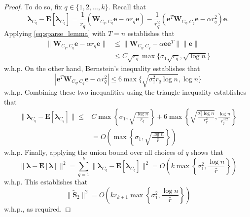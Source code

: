 \documentclass[twoside,11pt]{article}
\newcommand{\E}{\mathbf{E}}
\newcommand{\St}{\bs{\tilde S}}
\newcommand{\e}{\bs {e}}
\newcommand{\bs}{\boldsymbol}
\newcommand{\W}{\bs {W}}
\newcommand{\0}{\bs{0}}
\newcommand{\rbra}[1]{\ensuremath{\left( #1 \right)}} %
\newcommand{\bra}[1]{\ensuremath{\left\{ #1 \right\}}} %
\begin{document}
{\begin{proof}
\newcommand{\bl}{\bs{\lambda}}
To do so, fix $q \in \{1,2,\dots, k\}$. Recall that
\[
	\bl_{C_q} - \E[\bl_{C_q}] = \frac{1}{r_q} ( \W_{C_q, C_q} \e - \alpha r_q \e )
		- \frac{1}{r_q^2} (\e^T \W_{C_q, C_q} \e - \alpha r_q^2) \e.
\]
Applying \eqref{eq:sparse_lemma} with $T = n$ establishes that
\begin{align*}
	\| \W_{C_q, C_q} \e - \alpha r_q \e \| &\le  \|\W_{C_q, C_q}  - \alpha \e\e^T \| \|\e\| \\
	& \le C \sqrt{r_q} \max\{ \sigma_1 \sqrt{ r_q}, \sqrt{\log n} \} 
\end{align*}
w.h.p.
On the other hand, Bernstein's inequality establishes that
\[
	|  \e^T \W_{C_q, C_q} \e - \alpha r_q^2 | \le 6 \max \{ \sqrt{\sigma_1^2 r_q \log n}, \log n \}
\]
w.h.p.
Combining these two inequalities using the triangle inequality establishes that
\begin{align*}
	\| \bl_{C_q} - \E[\bl_{C_q}] \| \le &C \max \bra{ \sigma_1, \sqrt{\frac{\log n}{r_q } } }
		+ 6 \max \bra { \sqrt{ \frac{\sigma_1^2 \log n}{r_q^2}}, \frac{\log n}{r_q^{3/2} } } \\
		&= O \rbra{ \max \bra{ \sigma_1, \sqrt{ \frac{ \log n}{\hat r} } } }
\end{align*}
w.h.p.
Finally, applying the union bound over all choices of $q$ shows that
\[
	\| \bl - \E [ \bl ] \|^2 = \sum_{q=1}^k \| \bl_{C_q} - \E[\bl_{C_q}] \|^2
		= O \rbra{  k \max \bra{ \sigma_1^2, \frac{\log n}{\hat r} } }
\]
w.h.p.
This establishes that
\[
	\|\St_2\|^2 = O\rbra{k r_{k+1} \max \bra{ \sigma_1^2, \frac{\log n}{\hat r} } }
\]
w.h.p., as required.
\end{proof}


	


%

\begingroup
\raggedright


\endgroup
\end{document}
